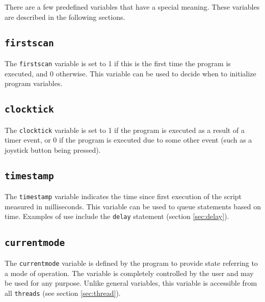 \documentclass{article}
\begin{document}
There are a few predefined variables that have a special meaning. These
variables are described in the following sections.

\subsection{{\tt firstscan}}
The {\tt firstscan} variable is set to 1 if this is the
first time the program is executed, and 0 otherwise. This
variable can be used to decide when to initialize program
variables.

\subsection{{\tt clocktick}}
The {\tt clocktick} variable is set to 1 if the program
is executed as a result of a timer event, or 0 if the
program is executed due to some other event (such as
a joystick button being pressed).

\subsection{{\tt timestamp}}
\label{sec:timestamp}
The {\tt timestamp} variable indicates the time since first
execution of the script measured in milliseconds. This variable can be used to
queue statements based on time. Examples of use include
the {\tt delay} statement (section \ref{sec:delay}).

\subsection{{\tt currentmode}}
The {\tt currentmode} variable is defined by the
program to provide state referring to a mode of
operation. The variable is completely controlled
by the user and may be used for any purpose.
Unlike general variables, this variable is
accessible from all {\tt threads} (see section \ref{sec:thread}).
\end{document}
